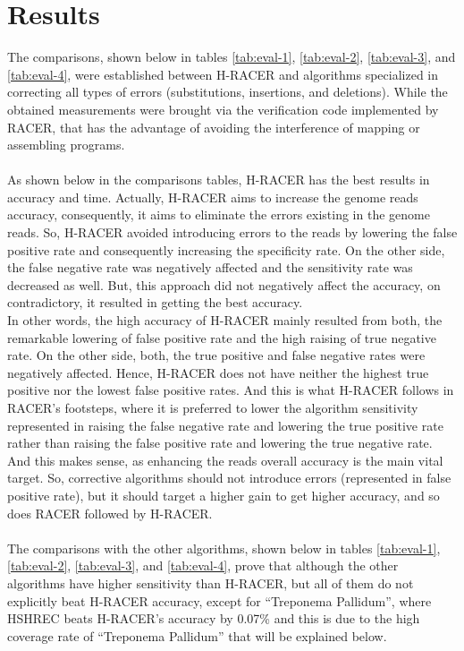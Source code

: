 \documentclass[12pt]{llncs}
\begin{document}
\section{Results}
The comparisons, shown below in tables \ref{tab:eval-1}, \ref{tab:eval-2}, \ref{tab:eval-3}, and \ref{tab:eval-4}, were established between H-RACER and algorithms specialized in correcting all types of errors (substitutions, insertions, and deletions). While the obtained measurements were brought via the verification code implemented by RACER, that has the advantage of avoiding the interference of mapping or assembling programs. 
\\\\
As shown below in the comparisons tables, H-RACER has the best results in accuracy and time. Actually, H-RACER aims to increase the genome reads accuracy, consequently, it aims to eliminate the errors existing in the genome reads. So, H-RACER avoided introducing errors to the reads by lowering the false positive rate and consequently increasing the specificity rate. On the other side, the false negative rate was negatively affected and the sensitivity rate was decreased as well. But, this approach did not negatively affect the accuracy, on contradictory, it resulted in getting the best accuracy.
\\
In other words, the high accuracy of H-RACER mainly resulted from both, the remarkable lowering of false positive rate and the high raising of true negative rate. On the other side, both, the true positive and false negative rates were negatively affected. Hence, H-RACER does not have neither the highest true positive nor the lowest false positive rates. And this is what H-RACER follows in RACER's footsteps, where it is preferred to lower the algorithm sensitivity represented in raising the false negative rate and lowering the true positive rate rather than raising the false positive rate and lowering the true negative rate. And this makes sense, as enhancing the reads overall accuracy is the main vital target. So, corrective algorithms should not introduce errors (represented in false positive rate), but it should target a higher gain to get higher accuracy, and so does RACER followed by H-RACER.
\\\\
The comparisons with the other algorithms, shown below in tables \ref{tab:eval-1}, \ref{tab:eval-2}, \ref{tab:eval-3}, and \ref{tab:eval-4}, prove that although the other algorithms have higher sensitivity than H-RACER, but all of them do not explicitly beat H-RACER accuracy, except for \enquote{Treponema Pallidum}, where HSHREC beats H-RACER's accuracy by 0.07\% and this is due to the high coverage rate of \enquote{Treponema Pallidum} that will be explained below.  
\end{document}
